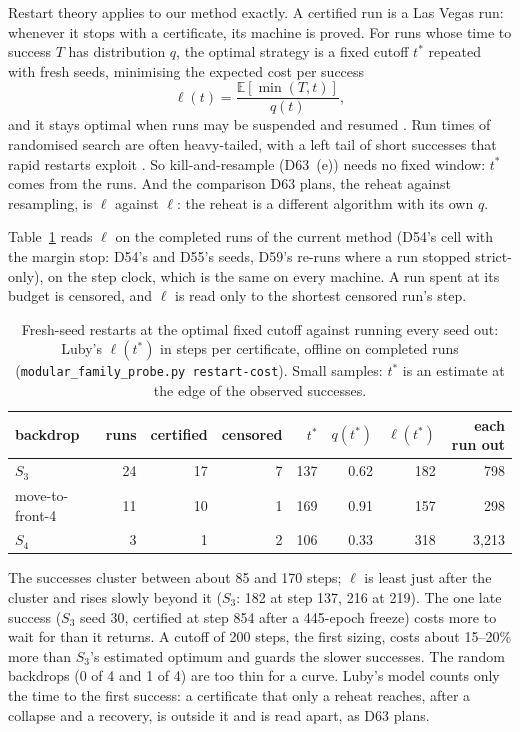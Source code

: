 \documentclass[11pt]{article}
\begin{document}
Restart theory applies to our method exactly. A certified run is a Las Vegas run: whenever it stops
with a certificate, its machine is proved. For runs whose time to success $T$ has distribution $q$,
the optimal strategy is a fixed cutoff $t^*$ repeated with fresh seeds, minimising the expected cost
per success
\begin{equation}
\ell(t) = \frac{\mathbb{E}[\min(T, t)]}{q(t)},
\end{equation}
and it stays optimal when runs may be suspended and resumed
\citep{luby-1993-optimal-speedup-las-vegas-algorithms}. Run times of randomised search are often
heavy-tailed, with a left tail of short successes that rapid restarts exploit
\citep{gomes-2000-heavy-tailed-phenomena-satisfiability-csp}. So kill-and-resample (D63~(e)) needs no
fixed window: $t^*$ comes from the runs. And the comparison D63 plans, the reheat against
resampling, is $\ell$ against $\ell$: the reheat is a different algorithm with its own $q$.

Table~\ref{tab:restarts} reads $\ell$ on the completed runs of the current method (D54's cell with the
margin stop: D54's and D55's seeds, D59's re-runs where a run stopped strict-only), on the step clock,
which is the same on every machine. A run spent at its budget is censored, and $\ell$ is read only to
the shortest censored run's step.

\begin{table}[t]
\centering
\caption{Fresh-seed restarts at the optimal fixed cutoff against running every seed out: Luby's
$\ell(t^*)$ in steps per certificate, offline on completed runs (\texttt{modular\_family\_probe.py
restart-cost}). Small samples: $t^*$ is an estimate at the edge of the observed successes.}
\label{tab:restarts}
\begin{tabular}{@{}lrrrrrrr@{}}
\toprule
backdrop & runs & certified & censored & $t^*$ & $q(t^*)$ & $\ell(t^*)$ & each run out \\
\midrule
$S_3$ & 24 & 17 & 7 & 137 & 0.62 & 182 & 798 \\
move-to-front-4 & 11 & 10 & 1 & 169 & 0.91 & 157 & 298 \\
$S_4$ & 3 & 1 & 2 & 106 & 0.33 & 318 & 3{,}213 \\
\bottomrule
\end{tabular}
\end{table}

The successes cluster between about 85 and 170 steps; $\ell$ is least just after the cluster and rises
slowly beyond it ($S_3$: 182 at step 137, 216 at 219). The one late success ($S_3$ seed 30, certified
at step 854 after a 445-epoch freeze) costs more to wait for than it returns. A cutoff of 200 steps,
the first sizing, costs about 15--20\% more than $S_3$'s estimated optimum and guards the slower
successes. The random backdrops (0 of 4 and 1 of 4) are too thin for a curve. Luby's model counts only
the time to the first success: a certificate that only a reheat reaches, after a collapse and a
recovery, is outside it and is read apart, as D63 plans.
\end{document}
